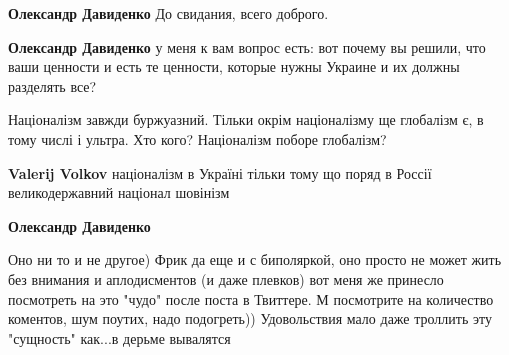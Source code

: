\begin{itemize}
\begin{itemize}
\textbf{Олександр Давиденко} До свидания, всего доброго.

 
\textbf{Олександр Давиденко} у меня к вам вопрос есть: вот почему вы решили,
что ваши ценности и есть те ценности, которые нужны Украине и их должны
разделять все?

 
Націоналізм завжди буржуазний.
Тільки окрім націоналізму ще глобалізм є, в тому числі і ультра.
Хто кого?
Націоналізм поборе глобалізм?

 
\textbf{Valerij Volkov} націоналізм в Україні тільки тому що поряд в Россії великодержавний націонал шовінізм

 
\textbf{Олександр Давиденко} 

Оно ни то и не другое) Фрик да еще и с биполяркой, оно просто не может жить без
внимания и аплодисментов (и даже плевков) вот меня же принесло посмотреть на
это "чудо" после поста в Твиттере. М посмотрите на количество коментов, шум
поутих, надо подогреть)) Удовольствия мало даже троллить эту "сущность" как...в
дерьме вывалятся 🤢

\end{itemize}

 


\end{itemize}
